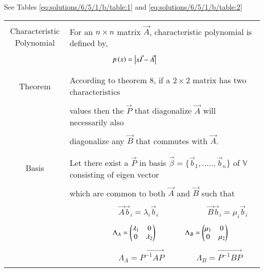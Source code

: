 See Tables \ref{eq:solutions/6/5/1/b/table:1} and \ref{eq:solutions/6/5/1/b/table:2}
%
\begin{table*}[ht!]
\centering
\begin{tabular}{|c|l|}
\hline
\multirow{3}{*}{Characteristic Polynomial} 
     & \\
     & For an $n\times n$ matrix $\vec{A}$, characteristic polynomial
     is defined by,\\
     &\\
     & $\qquad\qquad\qquad p\left(x\right)=\begin{vmatrix}x\Vec{I}-\Vec{A}\end{vmatrix}$\\
     &\\
\hline
\multirow{3}{*}{Theorem}
     &\\
     & According  to theorem 8, if a $2\times 2$ matrix has two 
     characteristics \\
     &\\
     & values then the $\vec{P}$ that diagonalize $\vec{A}$ will
     necessarily also   \\
     &\\
     & diagonalize any $\vec{B}$ that commutes with $\vec{A}$. \\
     &\\
\hline
\multirow{3}{*}{Basis}&\\
     & Let there exist a $\vec{P}$ in basis
     $\vec{\beta}=\{\vec{b}_1,.....,\vec{b}_n\}$ of $\mathbb{V}$  
     consisting of eigen vector\\
     &\\
     & which are common to both $\vec{A}$ and $\vec{B}$ such that\\
     &\\
     & $\qquad\qquad\qquad\vec{A}\vec{b}_i=\lambda_{i}\vec{b}_i
     \qquad\qquad\qquad\vec{B}\vec{b}_i=\mu_{i}\vec{b}_i$\\
     &\\
     & $\qquad\qquad\qquad\Lambda_{A}=\begin{pmatrix}\lambda_1&0\\0&\lambda
     _2\end{pmatrix}\qquad\qquad\Lambda_{B}=\begin{pmatrix}\mu_1&0\\0&\mu_2\end{pmatrix}$\\
     &\\
     & $\qquad\qquad\qquad\Lambda_{A}=\vec{P^{-1}AP} 
     \qquad\qquad\Lambda_{B}=\vec{P^{-1}BP}$\\
     &\\
\hline
\end{tabular}
\caption{Definitions and theorem used}
\label{eq:solutions/6/5/1/b/table:1}
\end{table*}

